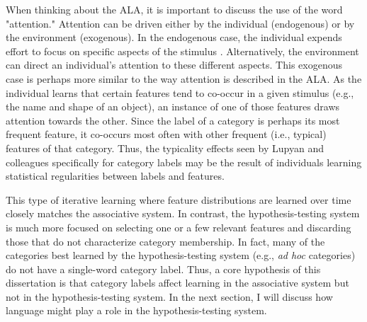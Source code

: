 \documentclass[../dissertation.tex]{subfiles}
\begin{document}
	When thinking about the ALA, it is important to discuss the use of the word "attention." Attention can be driven either by the individual (endogenous) or by the environment (exogenous). In the endogenous case, the individual expends effort to focus on specific aspects of the stimulus \citep{Engle2004}. Alternatively, the environment can direct an individual's attention to these different aspects. This exogenous case is perhaps more similar to the way attention is described in the ALA. As the individual learns that certain features tend to co-occur in a given stimulus (e.g., the name and shape of an object), an instance of one of those features draws attention towards the other. Since the label of a category is perhaps its most frequent feature, it co-occurs most often with other frequent (i.e., typical) features of that category. Thus, the typicality effects seen by Lupyan and colleagues specifically for category labels may be the result of individuals learning statistical regularities between labels and features. \par
	This type of iterative learning where feature distributions are learned over time closely matches the associative system. In contrast, the hypothesis-testing system is much more focused on selecting one or a few relevant features and discarding those that do not characterize category membership. In fact, many of the categories best learned by the hypothesis-testing system (e.g., \textit{ad hoc} categories) do not have a single-word category label. Thus, a core hypothesis of this dissertation is that category labels affect learning in the associative system but not in the hypothesis-testing system. In the next section, I will discuss how language might play a role in the hypothesis-testing system. 
	
\end{document}

